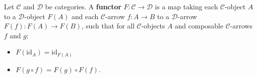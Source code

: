 \begin{definition}
    \label{def:functor}
    Let $\mathcal{C}$ and $\mathcal{D}$ be categories. A \textbf{functor} $F : \mathcal{C} \mathop{\to} \mathcal{D}$ is a map taking each $\mathcal{C}$-object $A$ to a $\mathcal{D}$-object $F(A)$ and each $\mathcal{C}$-arrow $f : A \mathop{\to} B$ to a $\mathcal{D}$-arrow $F(f) : F(A) \mathop{\to} F(B)$, such that for all $\mathcal{C}$-objects $A$ and composable $\mathcal{C}$-arrows $f$ and $g$:
    \begin{itemize}
        \item $F(\mathrm{id}_A) \mathop{=} \mathrm{id}_{F(A)}$
        \item $F(g \circ f) \mathop{=} F(g) \circ F(f)$.
    \end{itemize}
\end{definition}